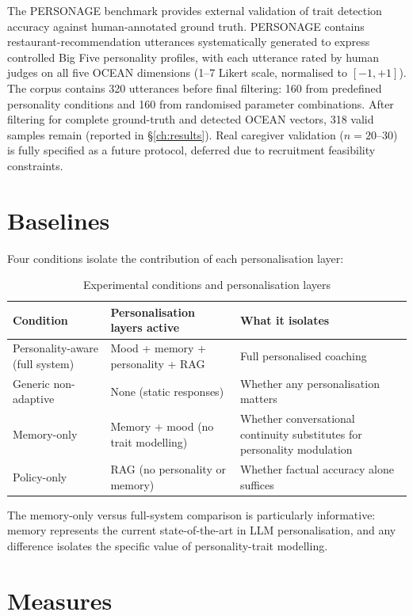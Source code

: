 \documentclass[10pt,a4paper]{report}
\begin{document}
The PERSONAGE benchmark \citep{Mairesse2011} provides external validation of trait detection accuracy against human-annotated ground truth. PERSONAGE contains restaurant-recommendation utterances systematically generated to express controlled Big Five personality profiles, with each utterance rated by human judges on all five OCEAN dimensions (1--7 Likert scale, normalised to $[-1, +1]$). The corpus contains 320 utterances before final filtering: 160 from predefined personality conditions and 160 from randomised parameter combinations. After filtering for complete ground-truth and detected OCEAN vectors, 318 valid samples remain (reported in \S\ref{ch:results}). Real caregiver validation ($n = 20$--30) is fully specified as a future protocol, deferred due to recruitment feasibility constraints.

\section{Baselines}

Four conditions isolate the contribution of each personalisation layer:

\begin{table}[H]
\centering\small
\caption{Experimental conditions and personalisation layers}
\begin{tabularx}{\textwidth}{@{}lXX@{}}
\toprule
Condition & Personalisation layers active & What it isolates \\
\midrule
Personality-aware (full system) & Mood + memory + personality + RAG & Full personalised coaching \\
Generic non-adaptive & None (static responses) & Whether any personalisation matters \\
Memory-only & Memory + mood (no trait modelling) & Whether conversational continuity substitutes for personality modulation \\
Policy-only & RAG (no personality or memory) & Whether factual accuracy alone suffices \\
\bottomrule
\end{tabularx}
\end{table}

The memory-only versus full-system comparison is particularly informative: memory represents the current state-of-the-art in LLM personalisation, and any difference isolates the specific value of personality-trait modelling.

\section{Measures}
\end{document}
